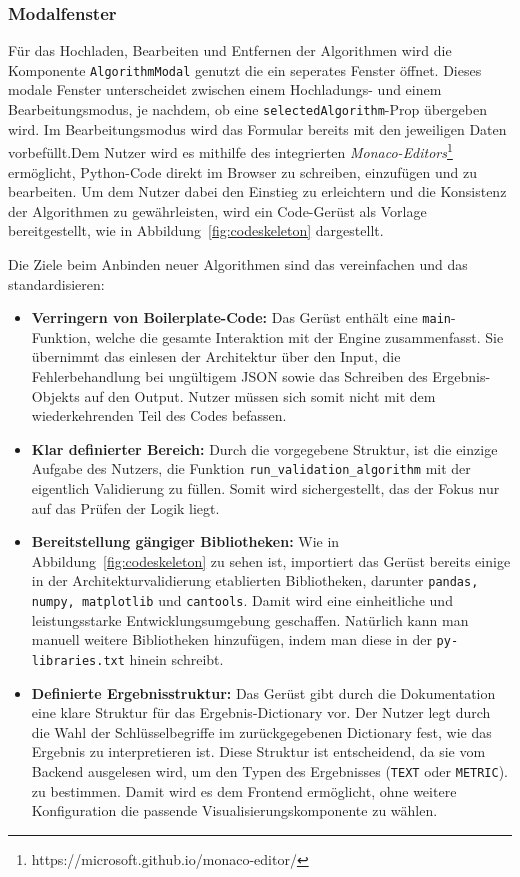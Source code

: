 \subsubsection*{Modalfenster}

Für das Hochladen, Bearbeiten und Entfernen der Algorithmen wird die Komponente \texttt{AlgorithmModal} genutzt die ein seperates Fenster öffnet. Dieses modale Fenster unterscheidet zwischen einem Hochladungs- und einem Bearbeitungsmodus, je nachdem, ob eine \texttt{selectedAlgorithm}-Prop übergeben wird. Im Bearbeitungsmodus wird das Formular bereits mit den jeweiligen Daten vorbefüllt.Dem Nutzer wird es mithilfe des integrierten \textit{Monaco-Editors}\footnote{https://microsoft.github.io/monaco-editor/} ermöglicht, Python-Code direkt im Browser zu schreiben, einzufügen und zu bearbeiten. Um dem Nutzer dabei den Einstieg zu erleichtern und die Konsistenz der Algorithmen zu gewährleisten, wird ein Code-Gerüst als Vorlage bereitgestellt, wie in Abbildung~\ref{fig:codeskeleton} dargestellt.

Die Ziele beim Anbinden neuer Algorithmen sind das vereinfachen und das standardisieren:

\begin{itemize}
  \item \textbf{Verringern von Boilerplate-Code:} Das Gerüst enthält eine \texttt{main}-Funktion, welche die gesamte Interaktion mit der Engine zusammenfasst. Sie übernimmt das einlesen der Architektur über den Input, die Fehlerbehandlung bei ungültigem JSON sowie das Schreiben des Ergebnis-Objekts auf den Output. Nutzer müssen sich somit nicht mit dem wiederkehrenden Teil des Codes befassen.
  \item \textbf{Klar definierter Bereich:} Durch die vorgegebene Struktur, ist die einzige Aufgabe des Nutzers, die Funktion \texttt{run\_validation\_algorithm} mit der eigentlich Validierung zu füllen. Somit wird sichergestellt, das der Fokus nur auf das Prüfen der Logik liegt.
  \item \textbf{Bereitstellung gängiger Bibliotheken:} Wie in Abbildung~\ref{fig:codeskeleton} zu sehen ist, importiert das Gerüst bereits einige in der Architekturvalidierung etablierten Bibliotheken, darunter \texttt{pandas, numpy, matplotlib} und \texttt{cantools}. Damit wird eine einheitliche und leistungsstarke Entwicklungsumgebung geschaffen. Natürlich kann man manuell weitere Bibliotheken hinzufügen, indem man diese in der \texttt{py-libraries.txt} hinein schreibt.
  \item \textbf{Definierte Ergebnisstruktur:} Das Gerüst gibt durch die Dokumentation eine klare Struktur für das Ergebnis-Dictionary vor. Der Nutzer legt durch die Wahl der Schlüsselbegriffe im zurückgegebenen Dictionary fest, wie das Ergebnis zu interpretieren ist. Diese Struktur ist entscheidend, da sie vom Backend ausgelesen wird, um den Typen des Ergebnisses (\texttt{TEXT} oder \texttt{METRIC}). zu bestimmen. Damit wird es dem Frontend ermöglicht, ohne weitere Konfiguration die passende Visualisierungskomponente zu wählen.
\end{itemize}

